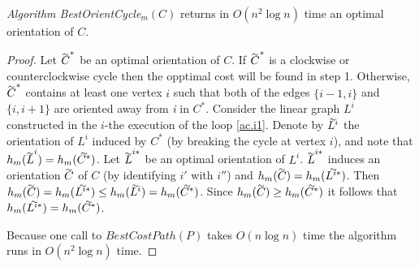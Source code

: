 \bigskip
\begin{theorem}\label{t.cycle-m}
\emph{Algorithm BestOrientCycle}$_m(C)$ returns in $O(n^2 \log n)$ time an optimal 
orientation of $C$.
\end{theorem}
\begin{proof}

Let $\tildeb{C}^*$ be an optimal orientation 
of $C$.
If $\tildeb{C}^*$ is a clockwise or counterclockwise cycle then the opptimal cost will be found in step 1.
Otherwise, $\tildeb{C}^*$ contains at least one vertex $i$ such that both of the edges $\{i-1,i\}$ and $\{i,i+1\}$
are oriented away from \textit{i} in $C^*$.  Consider the linear graph $L^i$ constructed in
the $i$-the execution of the loop \ref{ac.i1}. Denote by $\tildeb{L^i}$ the orientation of $L^i$ 
induced by $C^*$  (by breaking the cycle at vertex $i$), and note that 
$h_m(\tildeb{L}^i)=h_m(\tildeb{C^*})$. Let $\tildeb{L}^{i*}$ be an optimal orientation of $L^i$.
$\tildeb{L}^{i*}$ induces an orientation $\tildeb{C}$ of $C$ (by identifying $i'$ with $i''$)
and $h_m(\tildeb{C})=h_m(\tildeb{L^{i*}})$.  
Then $h_m(\tildeb{C})=h_m(\tildeb{L^{i*}})\leq h_m(\tildeb{L^i})=h_m(\tildeb{C^*})$.
Since $h_m(\tildeb{C})\geq h_m(\tildeb{C^*})$ it follows that $h_m(\tildeb{L^{i*}})= h_m(\tildeb{C^*})$.

Because one call to $BestCostPath(P)$ takes $O(n \log n)$ time the algorithm runs in $O(n^2 \log n)$ time.
\end{proof}